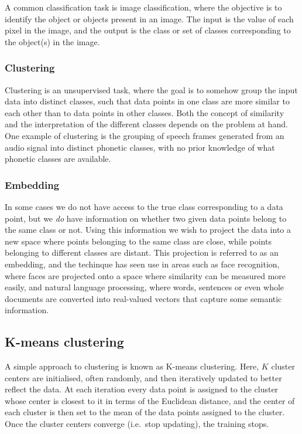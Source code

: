A common classification task is image classification, where the objective is to identify the object or objects present in an image.
The input is the value of each pixel in the image, and the output is the class or set of classes corresponding to the object(s) in the image.

\subsubsection{Clustering}

Clustering is an unsupervised task, where the goal is to somehow group the input data into distinct classes, such that data points in one class are more similar to each other than to data points in other classes.
Both the concept of similarity and the interpretation of the different classes depends on the problem at hand.
One example of clustering is the grouping of speech frames generated from an audio signal into distinct phonetic classes, with no prior knowledge of what phonetic classes are available.

\subsubsection{Embedding}

In some cases we do not have access to the true class corresponding to a data point, but we \emph{do} have information on whether two given data points belong to the same class or not.
Using this information we wish to project the data into a new space where points belonging to the same class are close, while points belonging to different classes are distant.
This projection is referred to as an embedding, and the techinque has seen use in areas such as face recognition, where faces are projected onto a space where similarity can be measured more easily, and natural language processing, where words, sentences or even whole documents are converted into real-valued vectors that capture some semantic information.

\subsection{K-means clustering}

A simple approach to clustering is known as K-means clustering.
Here, $K$ cluster centers are initialised, often randomly, and then iteratively updated to better reflect the data.
At each iteration every data point is assigned to the cluster whose center is closest to it in terms of the Euclidean distance, and the center of each cluster is then set to the mean of the data points assigned to the cluster.
Once the cluster centers converge (i.e.\ stop updating), the training stops.

